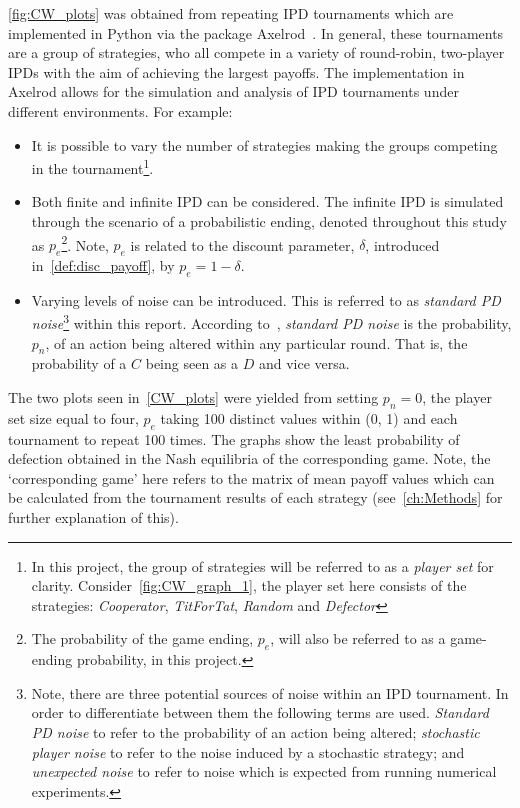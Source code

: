 \autoref{fig:CW_plots} was obtained from repeating IPD tournaments which are
implemented in Python via the package Axelrod~\cite{axelrodproject}. In general,
these tournaments are a group of strategies, who all compete in a variety of
round-robin, two-player IPDs with the aim of achieving the largest payoffs. The
implementation in Axelrod allows for the simulation and analysis of IPD
tournaments under different environments. For example:
\begin{itemize}
    \item It is possible to vary the number of strategies making the groups competing in the
    tournament\footnote{In this project, the group of strategies will be
    referred to as a \textit{player set} for clarity.
    Consider~\autoref{fig:CW_graph_1}, the player set here consists of the
    strategies: \textit{Cooperator}, \textit{TitForTat}, \textit{Random} and
    \textit{Defector}}.
    
    \item Both finite and infinite IPD can be considered. The infinite IPD is
    simulated through the scenario of a probabilistic ending, denoted throughout
    this study as \(p_{e}\)\footnote{The probability of the game ending,
    \(p_{e}\), will also be referred to as a game-ending
    probability, in this project.}. Note, \(p_{e}\) is related to the discount
    parameter, \(\delta \), introduced in~\autoref{def:disc_payoff}, by \(p_{e}
    = 1 - \delta \).
    
    \item Varying levels of noise can be introduced. This is referred to as
    \textit{standard PD noise}\footnote{Note, there are three potential sources
    of noise within an IPD tournament. In order to differentiate between them
    the following terms are used. \textit{Standard PD noise} to refer to the
    probability of an action being altered; \textit{stochastic player noise} to
    refer to the noise induced by a stochastic strategy; and \textit{unexpected
    noise} to refer to noise which is expected from running numerical experiments.} within this report. According
    to~\cite{glynatsi2020meta}, \textit{standard PD noise} is the probability,
    \(p_{n}\), of an action being altered within any particular round. That is,
    the probability of a \(C\) being seen as a \(D\) and vice versa.
\end{itemize}

The two plots seen in~\autoref{CW_plots} were yielded from setting \(p_{n} =
0\), the player set size equal to four, \(p_{e}\) taking 100 distinct values
within (0, 1) and each tournament to repeat 100 times. The graphs show the least
probability of defection obtained in the Nash equilibria of the corresponding
game. Note, the `corresponding game' here refers to the matrix of mean payoff
values which can be calculated from the tournament results of each strategy
(see~\autoref{ch:Methods} for further explanation of this).  

